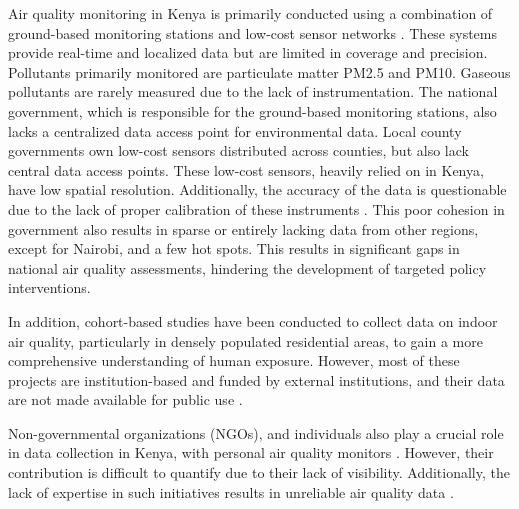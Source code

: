 \documentclass{article}
\begin{document}
Air quality monitoring in Kenya is primarily conducted using a combination of ground-based monitoring stations and low-cost sensor networks \cite{oguge_fine_2024, pope_airborne_2018}. These systems provide real-time and localized data but are limited in coverage and precision. Pollutants primarily monitored are particulate matter PM2.5 and PM10. Gaseous pollutants are rarely measured due to the lack of instrumentation. The national government, which is responsible for the ground-based monitoring stations, also lacks a centralized data access point for environmental data. Local county governments own low-cost sensors distributed across counties, but also lack central data access points. These low-cost sensors, heavily relied on in Kenya, have low spatial resolution. Additionally, the accuracy of the data is questionable due to the lack of proper calibration of these instruments \cite{tekouabou_towards_2022}. This poor cohesion in government also results in sparse or entirely lacking data from other regions, except for Nairobi, and a few hot spots. This results in significant gaps in national air quality assessments, hindering the development of targeted policy interventions.

In addition, cohort-based studies have been conducted to collect data on indoor air quality, particularly in densely populated residential areas, to gain a more comprehensive understanding of human exposure. However, most of these projects are institution-based and funded by external institutions, and their data are not made available for public use \cite{desouza_air_2020}.  

Non-governmental organizations (NGOs), and individuals also play a crucial role in data collection in Kenya, with personal air quality monitors \cite{singh_urban_2022}. However, their contribution is difficult to quantify due to their lack of visibility. Additionally, the lack of expertise in such initiatives results in unreliable air quality data \cite{pinder_opportunities_2019}.  
\end{document}
